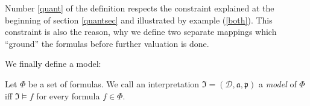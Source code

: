 Number \ref{quant} of the definition respects the constraint explained at the beginning of section \ref{quantsec} and illustrated by example (\ref{both}). %
This constraint is also the reason, 
why we define two separate mappings which ``ground'' the formulas before further valuation is done.

We finally define a model:

\begin{definition}[Model]
Let $\Phi$ be a set of \nthree formulas. We call an interpretation $\mathfrak{I}=(\mathcal{D},\mathfrak{a,p})$ a \textit{model} of $\Phi$ iff $\mathfrak{I}\models f$ for every formula $f\in \Phi$.
\end{definition}
%















